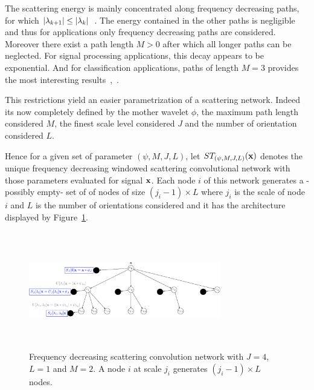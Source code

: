\documentclass{article}
\begin{document}
    The scattering energy is mainly concentrated along frequency decreasing paths, \ie for which $\left| \lambda_{k+1} \right| \leq \left| \lambda_{k} \right|$~\citep{mallat gis}. The energy contained in the other paths is negligible and thus for applications only frequency decreasing paths are considered. Moreover there exist a path length $M > 0$ after which all longer paths can be neglected. For signal processing applications, this decay appears to be exponential. And for classification applications, paths of length $M = 3$ provides the most interesting results~\citep{anden2011multiscale},~\citep{bruna2010classification}.
      
    This restrictions yield an easier parametrization of a scattering network. Indeed its now completely defined by the mother wavelet $\phi$, the maximum path length considered $M$, the finest scale level considered $J$ and the number of orientation considered $L$.
      
    Hence for a given set of parameter $(\psi, M,J,L)$, let $ST_{(\psi, M,J,L)}({\bf x})$ denotes the unique frequency decreasing windowed scattering convolutional network with those parameters evaluated for signal ${\bf x}$. Each node $i$ of this network generates a -possibly empty- set of of nodes of size $(j_{i}-1) \times L$ where $j_{i}$ is the scale of node $i$ and $L$ is the number of orientations considered and it has the architecture displayed by Figure~\ref{fig:SCN 2}.

    \begin{figure}
			\begin{center}
				\includegraphics[width=3.3in, height=2in, keepaspectratio]{ST_freqDec_crop.pdf}
				\caption[Frequency decreasing scattering convolution network.]{\centering  Frequency decreasing scattering convolution network 	with $J=4$, $L=1$ and $M=2$. A node $i$ at scale $j_{i}$ generates $(j_{i}-1) \times L$ nodes. }
				\label{fig:SCN 2}
			\end{center}
      \vspace{-15pt}
    \end{figure}
    
\end{document}
